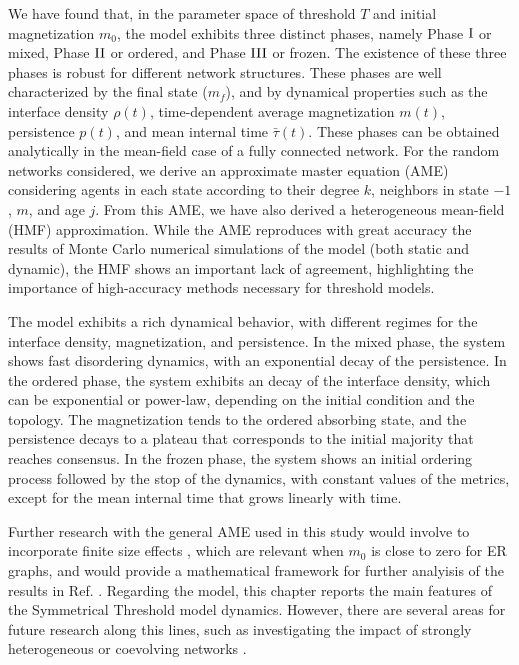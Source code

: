 We have found that, in the parameter space of threshold $T$ and initial magnetization $m_0$, the model exhibits three distinct phases, namely Phase ${\rm I}$ or mixed, Phase ${\rm II}$ or ordered, and Phase ${\rm III}$ or frozen. The existence of these three phases is robust for different network structures.
These phases are well characterized by the final state ($m_f$), and by dynamical properties such as the interface density $\rho(t)$, time-dependent average magnetization $m(t)$, persistence $p(t)$, and mean internal time $\bar{\tau}(t)$. These phases can be obtained analytically in the mean-field case of a fully connected network. For the random networks considered, we derive an approximate master equation (AME) \cite{gleeson-2013} considering agents in each state according to their degree $k$,  neighbors in state $-1$, $m$, and age $j$. From this AME, we have also derived a heterogeneous mean-field (HMF) approximation. While the AME reproduces with great accuracy the results of Monte Carlo numerical simulations of the model (both static and dynamic), the HMF shows an important lack of agreement, highlighting the importance of high-accuracy methods necessary for threshold models.

The model exhibits a rich dynamical behavior, with different regimes for the interface density, magnetization, and persistence. In the mixed phase, the system shows fast disordering dynamics, with an exponential decay of the persistence. In the ordered phase, the system exhibits an decay of the interface density, which can be exponential or power-law, depending on the initial condition and the topology. The magnetization tends to the ordered absorbing state, and the persistence decays to a plateau that corresponds to the initial majority that reaches consensus. In the frozen phase, the system shows an initial ordering process followed by the stop of the dynamics, with constant values of the metrics, except for the mean internal time that grows linearly with time.

Further research with the general AME used in this study would involve to incorporate finite size effects \cite{peralta-2020B}, which are relevant when $m_0$ is close to zero for ER graphs, and would provide a mathematical framework for further analyisis of the results in Ref. \cite{Konstantin}. Regarding the model, this chapter reports the main features of the Symmetrical Threshold model dynamics. However, there are several areas for future research along this lines, such as investigating the impact of strongly heterogeneous \cite{barabasi2009scale} or coevolving networks \cite{Zimmermann,vazquez-2008}.